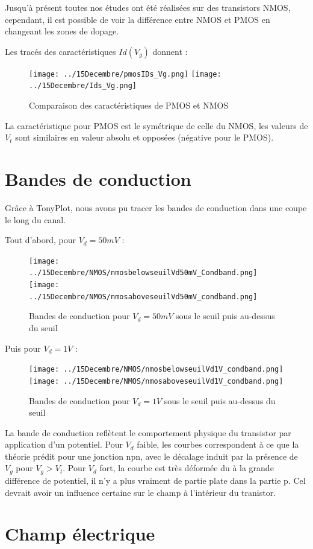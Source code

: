 \documentclass[a4paper,11pt]{report}
\begin{document}
Jusqu'à présent toutes nos études ont été réalisées sur des transistors NMOS, cependant, il est possible de voir la différence entre NMOS et PMOS en changeant les zones de dopage. 

Les tracés des caractéristiques $Id(V_g)$ donnent : 

\begin{figure}[H]
\centering
\texttt{[image: ../15Decembre/pmosIDs\_Vg.png]}
\texttt{[image: ../15Decembre/Ids\_Vg.png]}
\caption{Comparaison des caractéristiques de PMOS et NMOS}
\end{figure}

La caractéristique pour PMOS est le symétrique de celle du NMOS, les valeurs de $V_t$ sont similaires en valeur absolu et opposées (négative pour le PMOS).

\section{Bandes de conduction}

Grâce à TonyPlot, nous avons pu tracer les bandes de conduction dans une coupe le long du canal.

Tout d'abord, pour $V_d=50mV$ :
\begin{figure}[H]
\centering
\texttt{[image: ../15Decembre/NMOS/nmosbelowseuilVd50mV\_Condband.png]} 
\texttt{[image: ../15Decembre/NMOS/nmosaboveseuilVd50mV\_condband.png]}
\caption{Bandes de conduction pour $V_d=50mV$ sous le seuil puis au-dessus du seuil}
\end{figure}

Puis pour $V_d=1V$ :

\begin{figure}[H]
\centering
\texttt{[image: ../15Decembre/NMOS/nmosbelowseuilVd1V\_condband.png]} 
\texttt{[image: ../15Decembre/NMOS/nmosaboveseuilVd1V\_condband.png]}
\caption{Bandes de conduction pour $V_d=1V$ sous le seuil puis au-dessus du seuil}
\end{figure}

La bande de conduction reflètent le comportement physique du transistor par application d'un potentiel. Pour $V_d$ faible, les courbes correspondent à ce que la théorie prédit pour une jonction npn, avec le décalage induit par la présence de $V_g$ pour $V_g>V_t$. Pour $V_d$ fort, la courbe est très déformée du à la grande différence de potentiel, il n'y a plus vraiment de partie plate dans la partie p. Cel devrait avoir un influence certaine sur le champ à l'intérieur du tranistor.

\section{Champ électrique}
\end{document}
